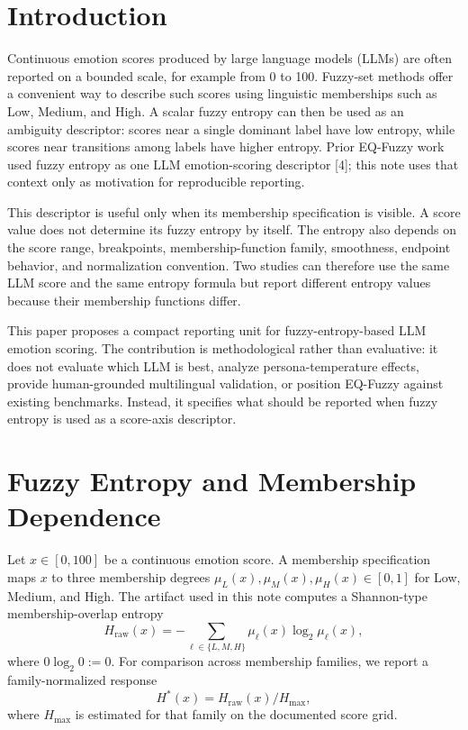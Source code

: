 \documentclass[a4paper,10pt,twocolumn]{myjarticle2}
\newcommand{\Hraw}{H_{\mathrm{raw}}}
\newcommand{\Hstar}{H^{\ast}}
\begin{document}
\section{Introduction}

Continuous emotion scores produced by large language models (LLMs) are often
reported on a bounded scale, for example from 0 to 100. Fuzzy-set methods offer
a convenient way to describe such scores using linguistic memberships such as
Low, Medium, and High. A scalar fuzzy entropy can then be used as an ambiguity
descriptor: scores near a single dominant label have low entropy, while scores
near transitions among labels have higher entropy.
Prior EQ-Fuzzy work used fuzzy entropy as one LLM emotion-scoring descriptor
[4]; this note uses that context only as motivation for reproducible reporting.

This descriptor is useful only when its membership specification is visible.
A score value does not determine its fuzzy entropy by itself. The entropy also
depends on the score range, breakpoints, membership-function family,
smoothness, endpoint behavior, and normalization convention. Two studies can
therefore use the same LLM score and the same entropy formula but report
different entropy values because their membership functions differ.

This paper proposes a compact reporting unit for fuzzy-entropy-based LLM
emotion scoring. The contribution is methodological rather than evaluative:
it does not evaluate which LLM is best, analyze persona-temperature effects,
provide human-grounded multilingual validation, or position EQ-Fuzzy against
existing benchmarks. Instead, it specifies what should be reported when fuzzy
entropy is used as a score-axis descriptor.

\section{Fuzzy Entropy and Membership Dependence}

Let $x \in [0,100]$ be a continuous emotion score. A membership specification
maps $x$ to three membership degrees
$\mu_L(x), \mu_M(x), \mu_H(x) \in [0,1]$ for Low, Medium, and High. The
artifact used in this note computes a Shannon-type membership-overlap entropy
\begin{equation}
\Hraw(x)=-\sum_{\ell \in \{L,M,H\}}\mu_\ell(x)\log_2\mu_\ell(x),
\end{equation}
where $0\log_2 0:=0$. For comparison across membership families, we report a
family-normalized response
\begin{equation}
\Hstar(x) = \Hraw(x) / H_{\max},
\end{equation}
where $H_{\max}$ is estimated for that family on the documented score grid.
\end{document}
